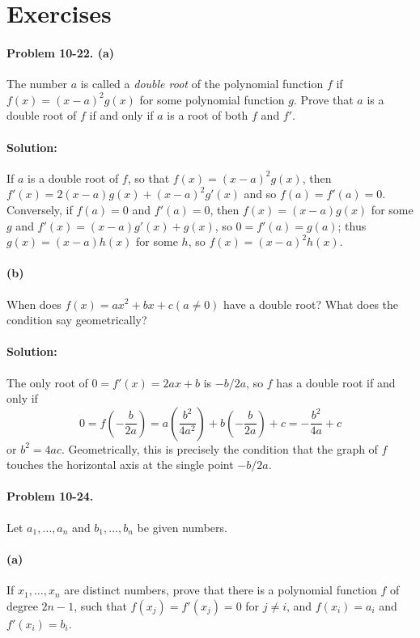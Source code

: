 \documentclass{article}
\begin{document}
\section*{Exercises}

\paragraph{Problem 10-22. (a)} The number $a$ is called a \emph{double root} of
the polynomial function $f$ if $f(x) = (x - a)^2g(x)$ for some polynomial
function $g$. Prove that $a$ is a double root of $f$ if and only if $a$ is a
root of both $f$ and $f'$.

\paragraph{Solution:} If $a$ is a double root of $f$, so that $f(x) = (x - a)^2
g(x)$, then $f'(x) = 2(x - a)g(x) + (x - a)^2g'(x)$ and so $f(a) = f'(a) = 0$.
Conversely, if $f(a) = 0$ and $f'(a) = 0$, then $f(x) = (x - a)g(x)$ for some
$g$ and $f'(x) = (x - a)g'(x) + g(x)$, so $0 = f'(a) = g(a)$; thus $g(x) =
(x - a)h(x)$ for some $h$, so $f(x) = (x - a)^2h(x)$.

\paragraph{(b)} When does $f(x) = ax^2 + bx + c (a \neq 0)$ have a double root?
What does the condition say geometrically?

\paragraph{Solution:} The only root of $0 = f'(x) = 2ax + b$ is $-b/2a$, so $f$
has a double root if and only if \begin{equation*}
  0 = f\left(-\frac{b}{2a}\right) = a\left(\frac{b^2}{4a^2}\right) + b\left(
    -\frac{b}{2a}\right) + c = -\frac{b^2}{4a} + c
\end{equation*} or $b^2 = 4ac$. Geometrically, this is precisely the condition
that the graph of $f$ touches the horizontal axis at the single point $-b/2a$.

\paragraph{Problem 10-24.} Let $a_1, \ldots, a_n$ and $b_1, \ldots, b_n$ be
given numbers.

\paragraph{(a)} If $x_1, \ldots, x_n$ are distinct numbers, prove that there is
a polynomial function $f$ of degree $2n - 1$, such that $f(x_j) = f'(x_j) = 0$
for $j \neq i$, and $f(x_i) = a_i$ and $f'(x_i) = b_i$.
\end{document}
